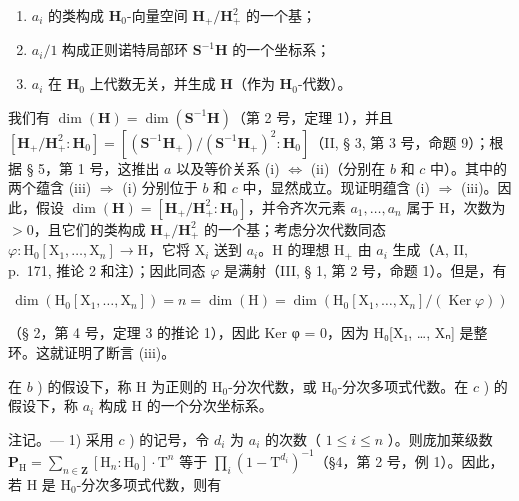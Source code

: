 \begin{enumerate}
\def\labelenumi{(\roman{enumi})}
\item
  \(a_{i}\) 的类构成 \(\mathbf{H}_{0}\)-向量空间 \(\mathbf{H}_{+}/\mathbf{H}_{+}^{2}\) 的一个基；
\item
  \(a_{i}/1\) 构成正则诺特局部环 \(\mathbf{S}^{-1}\mathbf{H}\) 的一个坐标系；
\item
  \(a_{i}\) 在 \(\mathbf{H}_{0}\) 上代数无关，并生成 \(\mathbf{H}\)（作为 \(\mathbf{H}_{0}\)-代数）。
\end{enumerate}

我们有 \(\dim(\mathbf{H})=\dim(\mathbf{S}^{-1}\mathbf{H})\)（第 2 号，定理 1），并且 \([\mathbf{H}_{+}/\mathbf{H}_{+}^{2}:\mathbf{H}_{0}]=[(\mathbf{S}^{-1}\mathbf{H}_{+})/(\mathbf{S}^{-1}\mathbf{H}_{+})^{2}:\mathbf{H}_{0}]\)（II, § 3, 第 3 号，命题 9）；根据 § 5，第 1 号，这推出 \(a\) 以及等价关系 (i) \(\Leftrightarrow\) (ii)（分别在 \(b\) 和 \(c\) 中）。其中的两个蕴含 (iii) \(\Rightarrow\) (i) 分别位于 \(b\) 和 \(c\) 中，显然成立。现证明蕴含 (i) \(\Rightarrow\) (iii)。因此，假设 \(\dim(\mathbf{H})=[\mathbf{H}_{+}/\mathbf{H}_{+}^{2}:\mathbf{H}_{0}]\)，并令齐次元素 \(a_{1},\ldots,a_{n}\) 属于 H，次数为 \(>0\)，且它们的类构成 \(\mathbf{H}_{+}/\mathbf{H}_{+}^{2}\) 的一个基；考虑分次代数同态 \(\varphi:\mathrm{H}_{0}[\mathrm{X}_{1},\ldots,\mathrm{X}_{n}]\to\mathrm{H}\)，它将 \(\mathrm{X}_{i}\) 送到 \(a_{i}\)。H 的理想 \(\mathrm{H}_{+}\) 由 \(a_{i}\) 生成（A, II, p.~171, 推论 2 和注）；因此同态 \(\varphi\) 是满射（III, § 1, 第 2 号，命题 1）。但是，有

\[
\dim \left(\mathrm{H} _ {0} \left[ \mathrm{X} _ {1}, \dots , \mathrm{X} _ {n} \right]\right) = n = \dim (\mathrm{H}) = \dim \left(\mathrm{H} _ {0} \left[ \mathrm{X} _ {1}, \dots , \mathrm{X} _ {n} \right] / (\operatorname{Ker} \varphi)\right)
\]

（§ 2，第 4 号，定理 3 的推论 1），因此 Ker φ = 0，因为 H₀{[}X₁, \ldots, Xₙ{]} 是整环。这就证明了断言 (iii)。

在 \(b\) ) 的假设下，称 H 为正则的 \(\mathrm{H}_{0}\)-分次代数，或 \(\mathrm{H}_{0}\)-分次多项式代数。在 \(c\) ) 的假设下，称 \(a_{i}\) 构成 H 的一个分次坐标系。

注记。--- 1) 采用 \(c\) ) 的记号，令 \(d_{i}\) 为 \(a_{i}\) 的次数（ \(1 \leqslant i \leqslant n\) ）。则庞加莱级数 \(\mathbf{P}_{\mathrm{H}} = \sum_{n \in \mathbf{Z}} [\mathrm{H}_{n} : \mathrm{H}_{0}] \cdot \mathrm{T}^{n}\) 等于 \(\prod_{i} (1 - \mathrm{T}^{d_{i}})^{-1}\)（§4，第 2 号，例 1）。因此，若 H 是 \(\mathrm{H}_{0}\)-分次多项式代数，则有

